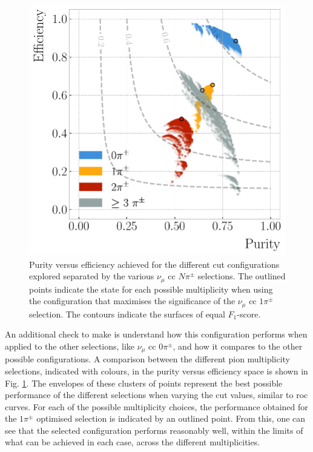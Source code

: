 \begin{figure}[t]
    \centering
    \includegraphics[width=.70\linewidth]{Images/GAr_selection/pion_selection_all_in_one_purity_vs_efficiency.pdf}
    \caption[Purity versus efficiency achieved for the different cut configurations explored separated by the various $\nu_{\mu}$ \gls{cc} $N\pi^{\pm}$ selections.]{Purity versus efficiency achieved for the different cut configurations explored separated by the various $\nu_{\mu}$ \gls{cc} $N\pi^{\pm}$ selections. The outlined points indicate the state for each possible multiplicity when using the configuration that maximises the significance of the $\nu_{\mu}$ \gls{cc} $1\pi^{\pm}$ selection. The contours indicate the surfaces of equal $F_{1}$-score.}
    \label{fig:pion_purity_vs_efficiency}
\end{figure}

An additional check to make is understand how this configuration performs when applied to the other selections, like $\nu_{\mu}$ \gls{cc} $0\pi^{\pm}$, and how it compares to the other possible configurations. A comparison between the different pion multiplicity selections, indicated with colours, in the purity versus efficiency space is shown in Fig. \ref{fig:pion_purity_vs_efficiency}. The envelopes of these clusters of points represent the best possible performance of the different selections when varying the cut values, similar to \gls{roc} curves. For each of the possible multiplicity choices, the performance obtained for the $1\pi^{\pm}$ optimised selection is indicated by an outlined point. From this, one can see that the selected configuration performs reasonably well, within the limits of what can be achieved in each case, across the different multiplicities.


